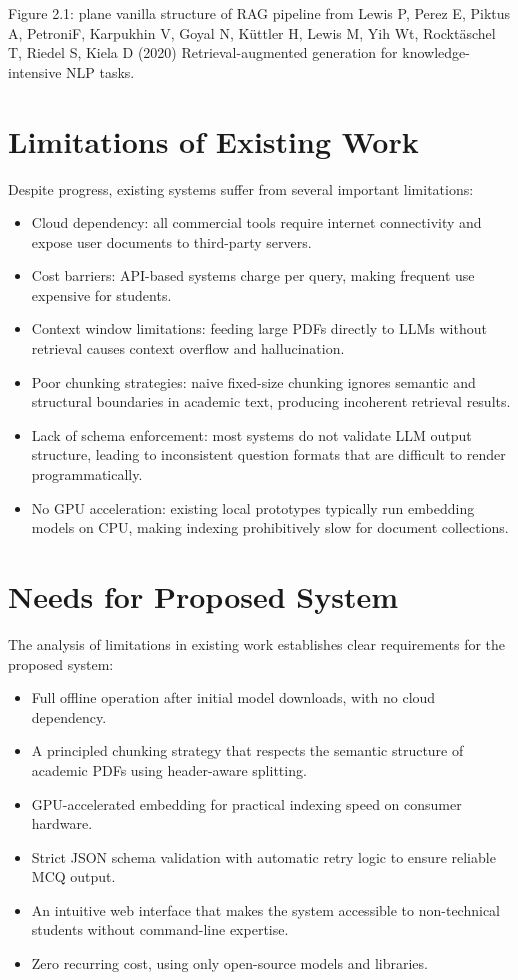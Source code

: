 \documentclass[12pt,a4paper]{report}
\begin{document}
Figure 2.1: plane vanilla structure of RAG pipeline from Lewis P, Perez E, Piktus A,   PetroniF, Karpukhin V, Goyal N, Küttler H, Lewis M, Yih Wt, Rocktäschel T, Riedel S, Kiela D (2020) Retrieval-augmented generation for knowledge-intensive NLP tasks.
\section{Limitations of Existing Work}
Despite progress, existing systems suffer from several important limitations:
\begin{itemize}
\item Cloud dependency: all commercial tools require internet connectivity and expose user documents to third-party servers.
\item Cost barriers: API-based systems charge per query, making frequent use expensive for students.
\item Context window limitations: feeding large PDFs directly to LLMs without retrieval causes context overflow and hallucination.
\item Poor chunking strategies: naive fixed-size chunking ignores semantic and structural boundaries in academic text, producing incoherent retrieval results.
\item Lack of schema enforcement: most systems do not validate LLM output structure, leading to inconsistent question formats that are difficult to render programmatically.
\item No GPU acceleration: existing local prototypes typically run embedding models on CPU, making indexing prohibitively slow for document collections.
\end{itemize}
\section{Needs for Proposed System}
The analysis of limitations in existing work establishes clear requirements for the proposed system:
\begin{itemize}
\item Full offline operation after initial model downloads, with no cloud dependency.
\item A principled chunking strategy that respects the semantic structure of academic PDFs using header-aware splitting.
\item GPU-accelerated embedding for practical indexing speed on consumer hardware.
\item Strict JSON schema validation with automatic retry logic to ensure reliable MCQ output.
\item An intuitive web interface that makes the system accessible to non-technical students without command-line expertise.
\item Zero recurring cost, using only open-source models and libraries.
\end{itemize}
\end{document}
